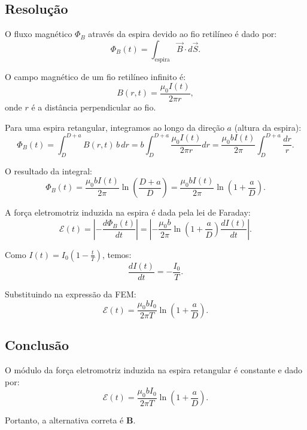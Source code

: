 \documentclass[a4paper,12pt]{article}
\begin{document}
\begin{flushleft}
\subsection{Resolução}

O fluxo magnético $\Phi_B$ através da espira devido ao fio retilíneo é dado por:
\[
\Phi_B(t) = \int_{\text{espira}} \vec{B} \cdot d\vec{S}.
\]

O campo magnético de um fio retilíneo infinito é:
\[
B(r,t) = \frac{\mu_0 I(t)}{2\pi r},
\]
onde $r$ é a distância perpendicular ao fio.

Para uma espira retangular, integramos ao longo da direção $a$ (altura da espira):
\[
\Phi_B(t) = \int_{D}^{D+a} B(r,t) \, b \, dr = b \int_{D}^{D+a} \frac{\mu_0 I(t)}{2\pi r} dr = \frac{\mu_0 b I(t)}{2\pi} \int_{D}^{D+a} \frac{dr}{r}.
\]

O resultado da integral:
\[
\Phi_B(t) = \frac{\mu_0 b I(t)}{2\pi} \ln\left(\frac{D+a}{D}\right) = \frac{\mu_0 b I(t)}{2\pi} \ln\left(1 + \frac{a}{D}\right).
\]

A força eletromotriz induzida na espira é dada pela lei de Faraday:
\[
\mathcal{E}(t) = \left| - \frac{d\Phi_B(t)}{dt} \right| = \left| - \frac{\mu_0 b}{2\pi} \ln\left(1 + \frac{a}{D}\right) \frac{d I(t)}{dt} \right|.
\]

Como $I(t) = I_0 \left(1 - \frac{t}{T}\right)$, temos:
\[
\frac{d I(t)}{dt} = - \frac{I_0}{T}.
\]

Substituindo na expressão da FEM:
\[
\mathcal{E}(t) = \frac{\mu_0 b I_0}{2\pi T} \ln\left(1 + \frac{a}{D}\right).
\]

\subsection{Conclusão}

O módulo da força eletromotriz induzida na espira retangular é constante e dado por:
\[
\boxed{\mathcal{E}(t) = \frac{\mu_0 b I_0}{2\pi T} \ln\left(1 + \frac{a}{D}\right)}.
\]

Portanto, a alternativa correta é \colorbox{green!50}{\textbf{B}}.

\end{flushleft}




\newpage 
\end{document}
